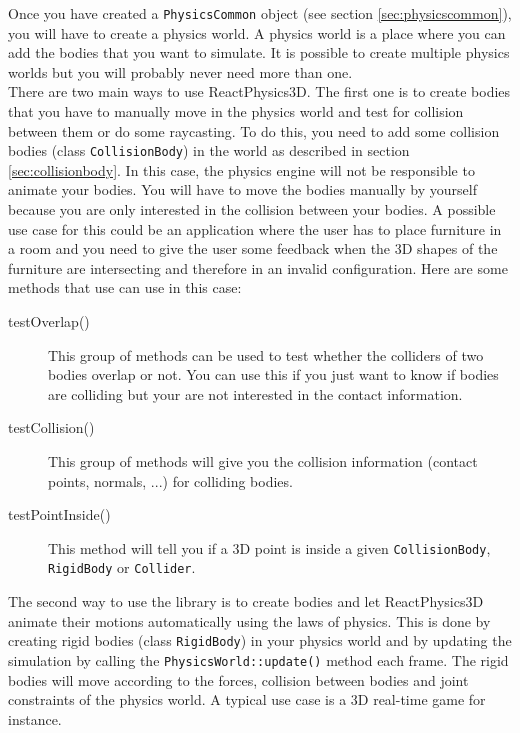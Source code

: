 \documentclass[a4paper,12pt]{article}
\begin{document}
    Once you have created a \texttt{PhysicsCommon} object (see section \ref{sec:physicscommon}), you will have to create a physics world. A physics world is
    a place where you can add the bodies that you want to simulate. It is possible to create multiple physics worlds but you will probably never need more
    than one. \\

    There are two main ways to use ReactPhysics3D. The first one is to create bodies that you have to manually move in the physics world and test for
    collision between them or do some raycasting. To do this, you need to add some collision bodies (class \texttt{CollisionBody}) in the world as
    described in section \ref{sec:collisionbody}. In this case, the physics engine will not be responsible to animate your bodies. You will have to move
    the bodies manually by yourself because you are only interested in the collision between your bodies. A possible use case for this could be an
    application where the user has to place furniture in a room and you need to give the user some feedback when the 3D shapes of the furniture are
    intersecting and therefore in an invalid configuration. Here are some methods that use can use in this case: \\
    
    \begin{description}
       \item[testOverlap()] This group of methods can be used to test whether the colliders of two bodies overlap or not. You can use this if you just want to
	       know if bodies are colliding but your are not interested in the contact information. 
       \item[testCollision()] This group of methods will give you the collision information (contact points, normals, ...) for colliding bodies.
       \item[testPointInside()] This method will tell you if a 3D point is inside a given \texttt{CollisionBody}, \texttt{RigidBody} or \texttt{Collider}. 
    \end{description}

    The second way to use the library is to create bodies and let ReactPhysics3D animate their motions automatically using the laws of physics. This is
    done by creating rigid bodies (class \texttt{RigidBody}) in your physics world and by updating the simulation by calling the 
    \texttt{PhysicsWorld::update()} method each frame. The rigid bodies will move according to the forces, collision between bodies and joint constraints of
    the physics world. A typical use case is a 3D real-time game for instance.
\end{document}
